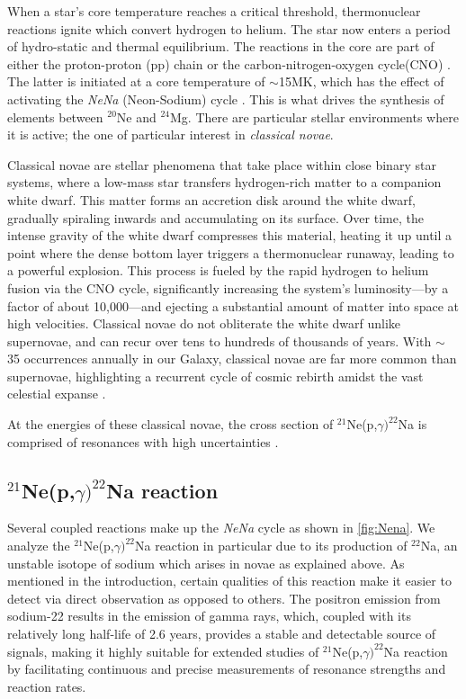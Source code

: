 \documentclass[a4paper,12pt]{article}
\def\reac{$^{21}$Ne(p,$\gamma)^{22}$Na reaction }
\begin{document}
    When a star's core temperature reaches a critical threshold, thermonuclear reactions ignite which convert hydrogen to helium.  The star now enters a period of hydro-static and thermal equilibrium.  The reactions in the core are part of either the proton-proton (pp) chain or the carbon-nitrogen-oxygen cycle(CNO) \cite{iliadis2015}.  The latter is initiated at a core temperature of $\sim$15MK, which has the effect of activating the \textit{NeNa} (Neon-Sodium) cycle \cite{fowler1956}.  This is what drives the synthesis of elements between $^{20}$Ne and $^{24}$Mg.  There are particular stellar environments where it is active; the one of particular interest in \textit{classical novae}.  

    Classical novae are stellar phenomena that take place within close binary star systems, where a low-mass star transfers hydrogen-rich matter to a companion white dwarf. This matter forms an accretion disk around the white dwarf, gradually spiraling inwards and accumulating on its surface. Over time, the intense gravity of the white dwarf compresses this material, heating it up until a point where the dense bottom layer triggers a thermonuclear runaway, leading to a powerful explosion. This process is fueled by the rapid hydrogen to helium fusion via the CNO cycle, significantly increasing the system's luminosity—by a factor of about 10,000—and ejecting a substantial amount of matter into space at high velocities. Classical novae do not obliterate the white dwarf unlike supernovae, and can recur over tens to hundreds of thousands of years. With $\sim$ 35 occurrences annually in our Galaxy, classical novae are far more common than supernovae, highlighting a recurrent cycle of cosmic rebirth amidst the vast celestial expanse \cite{iliadis2015, boeltzig2016, masha2021}.

    At the energies of these classical novae, the cross section of $^{21}$Ne(p,$\gamma)^{22}$Na is comprised of resonances with high uncertainties \cite{chiara}. 

\subsection{$^{21}$Ne(p,$\gamma)^{22}$Na reaction}\label{reaction}

    Several coupled reactions make up the \textit{NeNa} cycle as shown in \ref{fig:Nena}.  We analyze the $^{21}$Ne(p,$\gamma)^{22}$Na reaction in particular due to its production of $^{22}$Na, an unstable isotope of sodium which arises in novae as explained above.  As mentioned in the introduction, certain qualities of this reaction make it easier to detect via direct observation as opposed to others.  The positron emission from sodium-22 results in the emission of gamma rays, which, coupled with its relatively long half-life of 2.6 years, provides a stable and detectable source of signals, making it highly suitable for extended studies of \reac by facilitating continuous and precise measurements of resonance strengths and reaction rates.  
    
\end{document}
